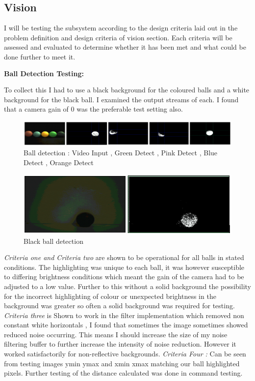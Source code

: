 \documentclass[10pt,twoside]{article}
\begin{document}
\subsection{Vision}
I will be testing the subsystem according to the design criteria laid out in the problem definition and design criteria of vision section. Each criteria will be assessed and evaluated to determine whether it has been met and what could be done further to meet it. 

\textbf{Ball Detection Testing: }

To collect this I had to use a black background for the coloured balls and a white background for the black ball. I examined the output streams of each. I found that a camera gain of 0 was the preferable test setting also. 

\begin{figure}[hbt!]
    \centering
    \includegraphics[scale=0.6]{BallDetectNon.PNG}
    \captionsetup{justification=centering}
    \caption{Ball detection : Video Input , Green Detect , Pink Detect , Blue Detect , Orange Detect}
\end{figure}


\begin{figure}[hbt!]
    \centering
    \includegraphics[scale=0.4]{BlackBallDetect.PNG}
    \captionsetup{justification=centering}
    \caption{Black ball detection}
\end{figure}

\textit{Criteria one and Criteria two} are shown to be operational for all balls in stated conditions. The highlighting was unique to each ball, it was however susceptible to differing brightness conditions which meant the gain of the camera had to be adjusted to a low value. Further to this without a solid background the possibility for the incorrect highlighting of colour or unexpected brightness in the background was greater so often a solid background was required for testing. 
\textit{Criteria three} is Shown to work in the filter implementation which removed non constant white horizontals , I found that sometimes the image sometimes showed reduced noise occurring. This means I should increase the size of my noise filtering buffer to further increase the intensity of noise reduction. However it worked satisfactorily for non-reflective backgrounds. 
\textit{Criteria Four : } Can be seen from testing images ymin ymax and xmin xmax matching our ball highlighted pixels. Further testing of the distance calculated was done in command testing.
\end{document}

